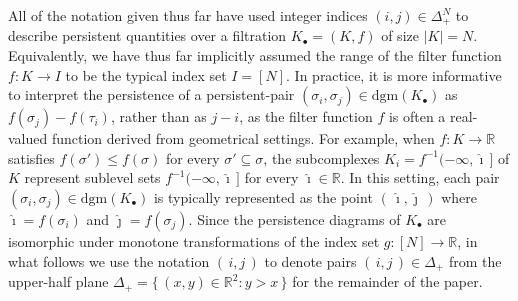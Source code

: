 \documentclass[12pt]{article}
\numberwithin{equation}{section}
\newcommand{\+}{%
	\raisebox{0.18ex}{\scaleobj{0.55}{+}}
}
\theoremstyle{definition}
\begin{document}
All of the notation given thus far have used integer indices $(i,j) \in \Delta_+^N$ to describe persistent quantities over a filtration $K_\bullet = (K, f)$ of size $\lvert K \rvert = N$. Equivalently, we have thus far implicitly assumed the range of the filter function $f : K \to I$ to be the typical index set $I = [N]$.
In practice, it is more informative to interpret the persistence of a persistent-pair $(\sigma_i, \sigma_j) \in \mathrm{dgm}(K_\bullet)$ as $f(\sigma_j) - f(\tau_i)$, rather than as $j - i$, as the filter function $f$ is often a real-valued function derived from geometrical settings.
For example, when $f : K \to \mathbb{R}$ satisfies $f(\sigma') \leq f(\sigma)$ for every $\sigma' \subseteq \sigma$, the subcomplexes $K_i = f^{-1}(-\infty, \hat\imath \,]$ of $K$ represent sublevel sets $f^{-1}(-\infty, \hat\imath \,]$ for every $\hat\imath \in \mathbb{R}$. 
In this setting, each pair $(\sigma_i, \sigma_j) \in \mathrm{dgm}(K_\bullet)$ is typically represented as the point $(\, \hat\imath, \hat\jmath \, )$ where $\hat\imath = f(\sigma_i)$ and $\hat\jmath = f(\sigma_j)$.
Since the persistence diagrams of $K_\bullet$ are isomorphic under monotone transformations of the index set $g : [N] \to \mathbb{R}$, in what follows we use the notation $(\,i, j\,)$ to denote pairs $(\,i, j\,) \in \Delta_{+}$ from the upper-half plane $\Delta_{+} = \{ \, (x,y) \in \mathbb{R}^2 : y > x \, \} $ for the remainder of the paper.


\end{document}
